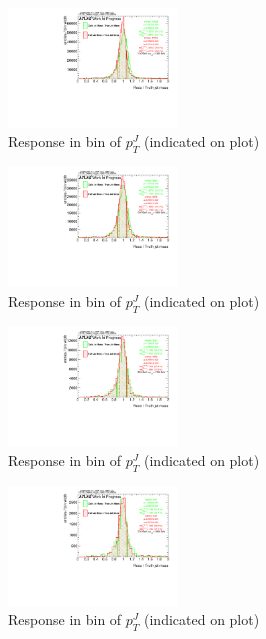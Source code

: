\begin{figure}

\includegraphics[width=0.4\textwidth]{appendixB/mTAS_Comb_Higgs_calibmCal_003ro_11:11:35-10-11-2016/8ResponsePTJ_h_JetRatio_mJ06CALO.pdf}
\caption{Response in bin of  $p_{T}^{J}$ (indicated on plot)} 

\end{figure}

%
\begin{figure}

\includegraphics[width=0.4\textwidth]{appendixB/mTAS_Comb_Higgs_calibmCal_003ro_11:11:35-10-11-2016/8ResponsePTJ_h_JetRatio_mJ07CALO.pdf}
\caption{Response in bin of  $p_{T}^{J}$ (indicated on plot)} 

\end{figure}


\begin{figure}

\includegraphics[width=0.4\textwidth]{appendixB/mTAS_Comb_Higgs_calibmCal_003ro_11:11:35-10-11-2016/8ResponsePTJ_h_JetRatio_mJ08CALO.pdf}
\caption{Response in bin of  $p_{T}^{J}$ (indicated on plot)} 

\end{figure}

\begin{figure}

\includegraphics[width=0.4\textwidth]{appendixB/mTAS_Comb_Higgs_calibmCal_003ro_11:11:35-10-11-2016/8ResponsePTJ_h_JetRatio_mJ09CALO.pdf}
\caption{Response in bin of  $p_{T}^{J}$ (indicated on plot)} 

\end{figure}

